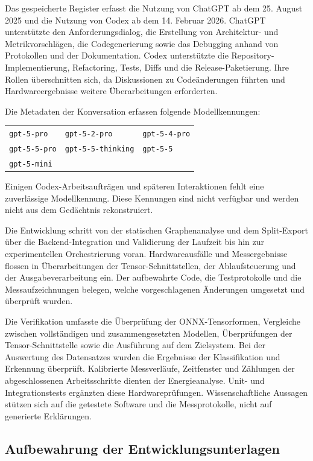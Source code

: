Das gespeicherte Register erfasst die Nutzung von ChatGPT ab dem 25. August 2025 und die Nutzung von Codex ab dem 14. Februar 2026. ChatGPT unterstützte den Anforderungsdialog, die Erstellung von Architektur- und Metrikvorschlägen, die Codegenerierung sowie das Debugging anhand von Protokollen und der Dokumentation. Codex unterstützte die Repository-Implementierung, Refactoring, Tests, Diffs und die Release-Paketierung. Ihre Rollen überschnitten sich, da Diskussionen zu Codeänderungen führten und Hardwareergebnisse weitere Überarbeitungen erforderten.

Die Metadaten der Konversation erfassen folgende Modellkennungen:
\begin{center}
\begin{tabular}{@{}lll@{}}
\texttt{gpt-5-pro} & \texttt{gpt-5-2-pro} & \texttt{gpt-5-4-pro} \\
\texttt{gpt-5-5-pro} & \texttt{gpt-5-5-thinking} & \texttt{gpt-5-5} \\
\texttt{gpt-5-mini} & & \\
\end{tabular}
\end{center}
Einigen Codex-Arbeitsaufträgen und späteren Interaktionen fehlt eine zuverlässige Modellkennung. Diese Kennungen sind nicht verfügbar und werden nicht aus dem Gedächtnis rekonstruiert.

Die Entwicklung schritt von der statischen Graphenanalyse und dem Split-Export über die Backend-Integration und Validierung der Laufzeit bis hin zur experimentellen Orchestrierung voran. Hardwareausfälle und Messergebnisse flossen in Überarbeitungen der Tensor-Schnittstellen, der Ablaufsteuerung und der Ausgabeverarbeitung ein. Der aufbewahrte Code, die Testprotokolle und die Messaufzeichnungen belegen, welche vorgeschlagenen Änderungen umgesetzt und überprüft wurden.

Die Verifikation umfasste die Überprüfung der ONNX-Tensorformen, Vergleiche zwischen vollständigen und zusammengesetzten Modellen, Überprüfungen der Tensor-Schnittstelle sowie die Ausführung auf dem Zielsystem. Bei der Auswertung des Datensatzes wurden die Ergebnisse der Klassifikation und Erkennung überprüft. Kalibrierte Messverläufe, Zeitfenster und Zählungen der abgeschlossenen Arbeitsschritte dienten der Energieanalyse. Unit- und Integrationstests ergänzten diese Hardwareprüfungen. Wissenschaftliche Aussagen stützen sich auf die getestete Software und die Messprotokolle, nicht auf generierte Erklärungen.

\subsection{Aufbewahrung der Entwicklungsunterlagen}
\label{app:ai_tool_development:records}

